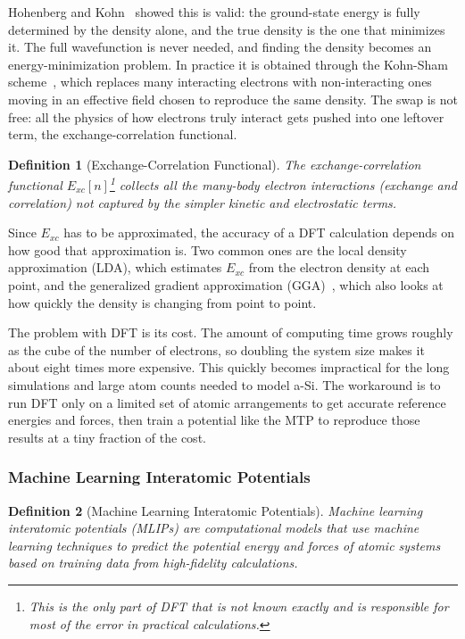 \documentclass{article}
\newtheorem{definition}{Definition}
\begin{document}
Hohenberg and Kohn~\cite{hohenberg1964} showed this is valid: the ground-state energy is fully determined by the density alone, and the true density is the one that minimizes it. The full wavefunction is never needed, and finding the density becomes an energy-minimization problem. In practice it is obtained through the Kohn-Sham scheme~\cite{kohn1965}, which replaces many interacting electrons with non-interacting ones moving in an effective field chosen to reproduce the same density. The swap is not free: all the physics of how electrons truly interact gets pushed into one leftover term, the exchange-correlation functional.
\begin{definition}[Exchange-Correlation Functional]
    The exchange-correlation functional $E_{xc}[n]$\footnote{This is the only part of DFT that is not known exactly and is responsible for most of the error in practical calculations.} collects all the many-body electron interactions (exchange and correlation) not captured by the simpler kinetic and electrostatic terms.
\end{definition}
Since $E_{xc}$ has to be approximated, the accuracy of a DFT calculation depends on how good that approximation is. Two common ones are the local density approximation (LDA), which estimates $E_{xc}$ from the electron density at each point, and the generalized gradient approximation (GGA)~\cite{pbe1996}, which also looks at how quickly the density is changing from point to point.

The problem with DFT is its cost. The amount of computing time grows roughly as the cube of the number of electrons, so doubling the system size makes it about eight times more expensive. This quickly becomes impractical for the long simulations and large atom counts needed to model a-Si. The workaround is to run DFT only on a limited set of atomic arrangements to get accurate reference energies and forces, then train a potential like the MTP to reproduce those results at a tiny fraction of the cost.

\subsubsection{Machine Learning Interatomic Potentials}
\begin{definition}[Machine Learning Interatomic Potentials]
    Machine learning interatomic potentials (MLIPs) are computational models that use machine learning techniques to predict the potential energy and forces of atomic systems based on training data from high-fidelity calculations.
\end{definition}
\end{document}
